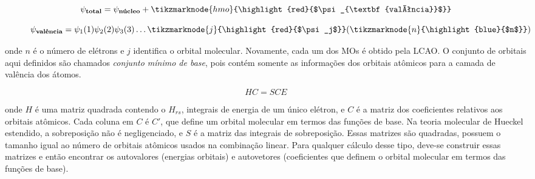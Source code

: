 \begin{figure}[htb]
    \vspace{2\baselineskip}
\begin{equation}
    \label{ap:eq:14}
    \psi_{\textbf{total}} = \psi_{\textbf{núcleo}} + \tikzmarknode{hmo}{\highlight{red}{$\psi_{\textbf{valência}}$}}
\end{equation}
\end{figure}

\begin{figure}[htb]
    \vspace{2\baselineskip}
\begin{equation}
    \psi_{\textbf{valência}} = \psi_1 (1) \psi_2 (2) \psi_3 (3) \dots \tikzmarknode{j}{\highlight{red}{$\psi_j$}} (\tikzmarknode{n}{\highlight{blue}{$n$}})
\end{equation}
\end{figure}

\noindent onde $n$ é o número de elétrons e $j$ identifica o orbital molecular. Novamente, cada um dos \gls{MOs} é obtido pela LCAO. O conjunto de orbitais aqui definidos são chamados \textit{conjunto mínimo de base}, pois contém somente as informações dos orbitais atômicos para a camada de valência dos átomos. 

\begin{equation}
    HC = SCE
\end{equation}

\noindent onde $H$ é uma matriz quadrada contendo o $H_{rs}$, integrais de energia de um único elétron, e $C$ é a matriz dos coeficientes relativos aos orbitais atômicos. Cada coluna em $C$ é $C'$, que define um orbital molecular em termos das funções de base. Na teoria molecular de Hueckel estendido, a sobreposição não é negligenciado, e $S$ é a matriz das integrais de sobreposição. Essas matrizes são quadradas, possuem o tamanho igual ao número de orbitais atômicos usados na combinação linear. Para qualquer cálculo desse tipo, deve-se construir essas matrizes e então encontrar os autovalores (energias orbitais) e autovetores (coeficientes que definem o orbital molecular em termos das funções de base).

